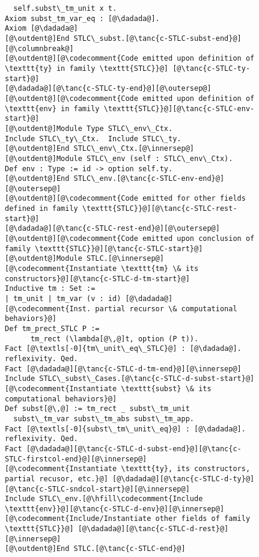 \begin{figure}
\begin{minipage}{\textwidth}
\begin{multicols}{2}
\begin{lstlisting}
  self.subst\_tm_unit x t.
Axiom subst_tm_var_eq : [@\dadada@].
Axiom [@\dadada@]
[@\outdent@]End STLC\_subst.[@\tanc{c-STLC-subst-end}@][@\columnbreak@]
[@\outdent@][@\codecomment{Code emitted upon definition of \texttt{ty} in family \texttt{STLC}}@] [@\tanc{c-STLC-ty-start}@]
[@\dadada@][@\tanc{c-STLC-ty-end}@][@\outersep@]
[@\outdent@][@\codecomment{Code emitted upon definition of \texttt{env} in family \texttt{STLC}}@][@\tanc{c-STLC-env-start}@]
[@\outdent@]Module Type STLC\_env\_Ctx.
Include STLC\_ty\_Ctx.  Include STLC\_ty.
[@\outdent@]End STLC\_env\_Ctx.[@\innersep@]
[@\outdent@]Module STLC\_env (self : STLC\_env\_Ctx).
Def env : Type := id -> option self.ty.
[@\outdent@]End STLC\_env.[@\tanc{c-STLC-env-end}@][@\outersep@]
[@\outdent@][@\codecomment{Code emitted for other fields defined in family \texttt{STLC}}@][@\tanc{c-STLC-rest-start}@]
[@\dadada@][@\tanc{c-STLC-rest-end}@][@\outersep@]
[@\outdent@][@\codecomment{Code emitted upon conclusion of family \texttt{STLC}}@][@\tanc{c-STLC-start}@]
[@\outdent@]Module STLC.[@\innersep@]
[@\codecomment{Instantiate \texttt{tm} \& its constructors}@][@\tanc{c-STLC-d-tm-start}@]
Inductive tm : Set :=
| tm_unit | tm_var (v : id) [@\dadada@]
[@\codecomment{Inst. partial recursor \& computational behaviors}@]
Def tm_prect_STLC P := 
      tm_rect (\lambda[@\,@]t, option (P t)).
Fact [@\textls[-0]{tm\_unit\_eq\_STLC}@] : [@\dadada@]. reflexivity. Qed.
Fact [@\dadada@][@\tanc{c-STLC-d-tm-end}@][@\innersep@]
Include STLC\_subst\_Cases.[@\tanc{c-STLC-d-subst-start}@]
[@\codecomment{Instantiate \texttt{subst} \& its computational behaviors}@]
Def subst[@\,@] := tm_rect _ subst\_tm_unit
  subst\_tm_var subst\_tm_abs subst\_tm_app.
Fact [@\textls[-0]{subst\_tm\_unit\_eq}@] : [@\dadada@]. reflexivity. Qed.
Fact [@\dadada@][@\tanc{c-STLC-d-subst-end}@][@\tanc{c-STLC-firstcol-end}@][@\innersep@]
[@\codecomment{Instantiate \texttt{ty}, its constructors, partial recusor, etc.}@] [@\dadada@][@\tanc{c-STLC-d-ty}@][@\tanc{c-STLC-sndcol-start}@][@\innersep@]
Include STLC\_env.[@\hfill\codecomment{Include \texttt{env}}@][@\tanc{c-STLC-d-env}@][@\innersep@]
[@\codecomment{Include/Instantiate other fields of family \texttt{STLC}}@] [@\dadada@][@\tanc{c-STLC-d-rest}@][@\innersep@]
[@\outdent@]End STLC.[@\tanc{c-STLC-end}@]
\end{lstlisting}


\end{multicols}
\end{minipage}
\end{figure}
